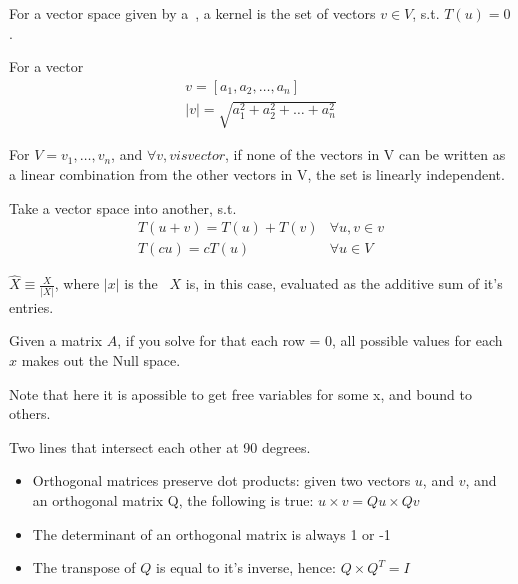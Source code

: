 \begin{definition}[Kernel]
    For a vector space given by a~, a kernel is the set
    of vectors $v \in V$, s.t. $T(u) = 0$.
\end{definition}

\begin{definition}\label{vectorlength}
    For a vector 
    \begin{align*}
        v = [a_{1}, a_{2}, \dots , a_{n}] \\
        |v| = \sqrt{a^{2}_{1} + a^{2}_{2} + \dots + a^{2}_{n}}{}
    \end{align*}
\end{definition}

\begin{definition}
    For $V = {v_{1}, \dots, v_{n}}$, and $\forall v, v is vector$,
    if none of the vectors in V can be written as a linear combination
    from the other vectors in V, the set is linearly independent.
\end{definition}

\begin{definition}\label{lintrans}
    Take a vector space into another, s.t.\
    \begin{align}
        T(u + v) = T(u) + T(v) &\forall u,v \in v \\
        T(cu) = cT(u) &\forall u \in V
    \end{align}
\end{definition}

\begin{definition}
    $ \hat{X} \equiv \frac{X}{|X|} $, where $|x|$ is the~
    $X$ is, in this case, evaluated as the additive sum of it's entries.
\end{definition}

\begin{definition}
    Given a matrix $A$, if you solve for that each row = 0,
    all possible values for each $x$ makes out the Null space.

    Note that here it is apossible to get free variables for 
    some x, and bound to others.

\end{definition}



\begin{definition}[Orthogonal]\label{orthogonal}
    Two lines that intersect each other at 90 degrees.\\
    \begin{itemize}
        \item Orthogonal matrices preserve dot products:
        given two vectors $u$, and $v$, and an orthogonal matrix Q,
        the following is true:
        $u \times v = Qu \times Qv$
        \item The determinant of an orthogonal matrix is always 1 or -1
        \item The transpose of $Q$ is equal to it's inverse, hence:
            $Q \times Q^{T} = I$
    \end{itemize}
\end{definition}

